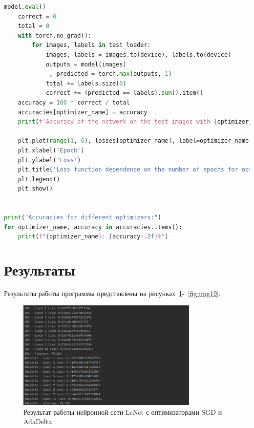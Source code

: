 \documentclass[a4paper, 14pt]{extarticle}
\begin{document}
\begin{lstlisting}[language={python},caption={ResNet (34)},label={lst:code3}]
    model.eval()
    correct = 0
    total = 0
    with torch.no_grad():
        for images, labels in test_loader:
            images, labels = images.to(device), labels.to(device)
            outputs = model(images)
            _, predicted = torch.max(outputs, 1)
            total += labels.size(0)
            correct += (predicted == labels).sum().item()
    accuracy = 100 * correct / total
    accuracies[optimizer_name] = accuracy
    print(f'Accuracy of the network on the test images with {optimizer_name} optimizer: {accuracy:.2f}%')

    plt.plot(range(1, 6), losses[optimizer_name], label=optimizer_name)
    plt.xlabel('Epoch')
    plt.ylabel('Loss')
    plt.title('Loss function dependence on the number of epochs for optimizer ' + optimizer_name)
    plt.legend()
    plt.show()


print("Accuracies for different optimizers:")
for optimizer_name, accuracy in accuracies.items():
    print(f"{optimizer_name}: {accuracy:.2f}%")

\end{lstlisting}

\section{Результаты}\label{Sect::res}

Результаты работы программы представлены на рисунках~\ref{fig:img1}-~\ref{fig:img19}.

\begin{figure}[!htb]
	\centering
	\includegraphics[width=0.8\textwidth]{img1}
\caption{Результат работы нейронной сети LeNet с оптимизаторами SGD и AdaDelta}
\label{fig:img1}
\end{figure}
\end{document}
